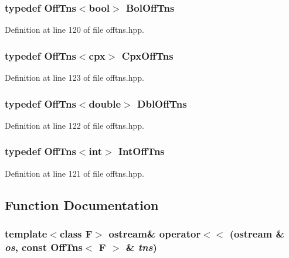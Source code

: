 \subsubsection{\setlength{\rightskip}{0pt plus 5cm}typedef {\bf Off\-Tns}$<$bool$>$ {\bf Bol\-Off\-Tns}}\label{offtns_8hpp_044189e3a2462652acb00b816cce56d3_044189e3a2462652acb00b816cce56d3}




Definition at line 120 of file offtns.hpp.
\subsubsection{\setlength{\rightskip}{0pt plus 5cm}typedef {\bf Off\-Tns}$<${\bf cpx}$>$ {\bf Cpx\-Off\-Tns}}\label{offtns_8hpp_7cb19915aa43182fa5c7e99b6c53e350_7cb19915aa43182fa5c7e99b6c53e350}




Definition at line 123 of file offtns.hpp.
\subsubsection{\setlength{\rightskip}{0pt plus 5cm}typedef {\bf Off\-Tns}$<$double$>$ {\bf Dbl\-Off\-Tns}}\label{offtns_8hpp_2a7d50167024971756f6d2cb37cb2938_2a7d50167024971756f6d2cb37cb2938}




Definition at line 122 of file offtns.hpp.
\subsubsection{\setlength{\rightskip}{0pt plus 5cm}typedef {\bf Off\-Tns}$<$int$>$ {\bf Int\-Off\-Tns}}\label{offtns_8hpp_bd67883f571db9bfa0fbfd3910ccc600_bd67883f571db9bfa0fbfd3910ccc600}




Definition at line 121 of file offtns.hpp.

\subsection{Function Documentation}
\subsubsection{\setlength{\rightskip}{0pt plus 5cm}template$<$class F$>$ ostream\& operator$<$$<$ (ostream \& {\em os}, const {\bf Off\-Tns}$<$ F $>$ \& {\em tns})\hspace{0.3cm}{\tt  [inline]}}\label{offtns_8hpp_2209c7092c28fb72cb2739f61651566c_2209c7092c28fb72cb2739f61651566c}




